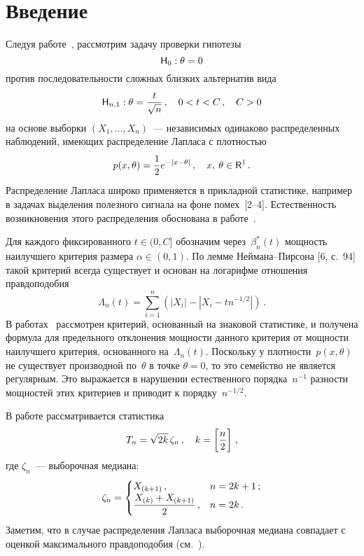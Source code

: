       \begin{multicols}{2}

      \label{st\stat}


\section{Введение}

Следуя работе~\cite{3ben}, рассмотрим задачу проверки гипотезы
\begin{equation*}
{\sf H}_0: \theta = 0     
\end{equation*}
против последовательности сложных близких альтернатив вида
\begin{equation*}
{\sf H}_{n,1}: \theta = \displaystyle\frac{\displaystyle t\mathstrut}{\displaystyle \sqrt{n}\mathstrut}\,,\quad 0<t<C\,,\quad
 C > 0
\end{equation*}
на основе выборки $(X_1, \ldots , X_n)$~--- независимых одинаково распределенных наблюдений, имеющих распределение Лапласа 
с плотностью
\begin{equation}
p(x, \theta) = \displaystyle\frac{\displaystyle 1\mathstrut}{\displaystyle 2\mathstrut}e^{-|x-\theta|}\,, \quad x,\:
\theta \in{\sf R}^1\,. 
\label{e1.3b}
\end{equation}
Распределение Лапласа широко применяется в прикладной статистике, например
в задачах вы\-де\-ле\-ния полезного сигнала на фоне помех~[2--4].
Естественность возникновения этого распределения обоснована в
работе~\cite{6ben}.

Для каждого фиксированного $t\in (0,C]$
обозначим через~$\beta_n^*(t)$ мощность наилучшего критерия размера
$\alpha\in (0,1)$. По лемме Неймана--Пирсона %
[6, с.~94]
такой критерий всегда существует и  основан на логарифме отношения правдоподобия
\begin{equation}
\Lambda_n(t) = 
\sum_{i=1}^{n}\left( \left|X_i\right|-\left|X_i-tn^{-1/2}\right|\right)\,.
 \label{e1.4b}
\end{equation}
В работах~\cite{3ben, 2ben} рассмотрен критерий, основанный на знаковой статистике,
и получена формула для предельного отклонения мощности данного
критерия от мощности наилучшего критерия, основанного на~$\Lambda_n(t)$.
Поскольку у плотности~$p(x,\theta)$ не существует производной по~$\theta$ в 
точке $\theta = 0$, то это семейство не является регулярным.
Это выражается в нарушении естественного порядка~$n^{-1}$ разности мощностей
этих критериев и приводит к порядку~$n^{-1/2}$.

В  работе рассматривается статистика
\begin{equation*}
T_n = \sqrt{2k}\, \zeta_n\,,\quad k=\left[\displaystyle\frac{\displaystyle n\mathstrut}{\displaystyle 2\mathstrut}\right]\,, 
\end{equation*}
где $\zeta_n$~--- выборочная медиана:
\begin{equation*}
\zeta_n= 
\begin{cases}
X_{(k+1)}\,, & n=2k+1\,; \\
\displaystyle\frac{\displaystyle X_{(k)}+X_{(k+1)}\mathstrut}{\displaystyle 2\mathstrut}\,, &  n=2k\,.
\end{cases}
\end{equation*}
Заметим, что в случае распределения Лапласа выборочная медиана
совпадает с оценкой максимального правдоподобия (см.~\cite{1ben}).


\end{multicols}
